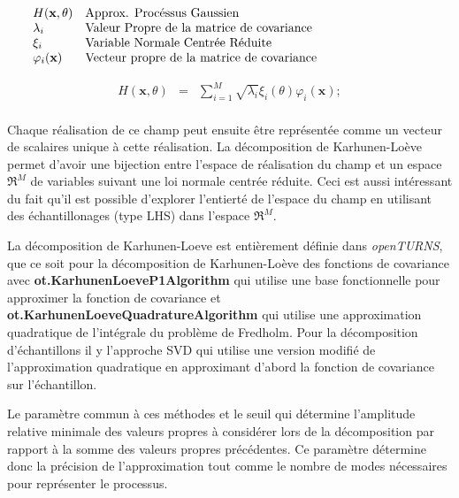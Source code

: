 \documentclass[a4paper,10pt]{article}
\begin{document}
   \[
      \begin{array}{lp{0.8\linewidth}}
         H(\textbf{x}, \theta) & Approx. Procéssus Gaussien \\
         \lambda_{i}          & Valeur Propre de la matrice de covariance \\
         \xi_{i}             & Variable Normale Centrée Réduite \\
         \varphi_{i}(\textbf{x}) & Vecteur propre de la matrice de covariance
      \end{array}
   \]

   \begin{eqnarray}
H(\textbf{x}, \theta) & = & \sum_{i=1}^{M}\sqrt{\lambda_{i}}\xi_{i}(\theta)\varphi_{i}(\textbf{x});
   \end{eqnarray}\\

Chaque réalisation de ce champ peut ensuite être représentée comme un vecteur de scalaires unique à cette réalisation. La décomposition de Karhunen-Loève permet d'avoir une bijection entre l'espace de réalisation du champ et un espace $\Re^{M}$ de variables suivant une loi normale centrée réduite. Ceci est aussi intéressant du fait qu'il est possible d'explorer l'entierté de l'espace du champ en utilisant des échantillonages (type LHS) dans l'espace $\Re^{M}$. \par

	 La décomposition de Karhunen-Loeve est entièrement définie dans \textit{openTURNS}, que ce soit pour la décomposition de Karhunen-Loève des fonctions de covariance avec \textbf{ot.KarhunenLoeveP1Algorithm} qui utilise une base fonctionnelle pour 	approximer la fonction de covariance et \textbf{ot.KarhunenLoeveQuadratureAlgorithm} qui utilise une approximation quadratique de l'intégrale du problème de Fredholm. Pour la décomposition d'échantillons il y l'approche SVD qui utilise une version modifié de l'approximation quadratique en approximant d'abord la fonction de covariance sur l'échantillon. \par 
	 
	 Le paramètre commun à ces méthodes et le seuil qui détermine l'amplitude relative minimale des valeurs propres à considérer lors de la décomposition par rapport à la somme des valeurs propres précédentes. Ce paramètre détermine donc la précision de l'approximation tout comme le nombre de modes nécessaires pour représenter le processus. \par 
	 
\end{document}
